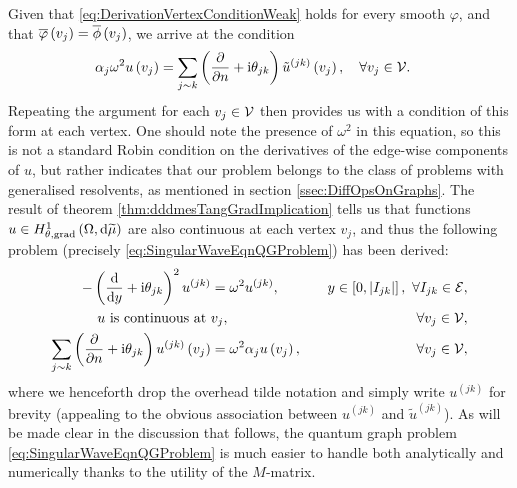 Given that \eqref{eq:DerivationVertexConditionWeak} holds for every smooth $\varphi$, and that $\overline{\varphi}\left( v_j \right)=\overline{\phi}\left( v_j \right)$, we arrive at the condition
\begin{align*}
	\alpha_j\omega^2 u\left( v_j \right) &= \sum_{j\sim k}\left( \dfrac{\partial }{\partial n} + \mathrm{i}\theta_{jk} \right)\tilde{u}^{(jk)}\left( v_j \right), \quad \forall v_j \in \mathcal{V}.
\end{align*}
Repeating the argument for each $v_j\in \mathcal{V}$ then provides us with a condition of this form at each vertex.
One should note the presence of $\omega^2$ in this equation, so this is not a standard Robin condition on the derivatives of the edge-wise components of $u$, but rather indicates that our problem belongs to the class of problems with generalised resolvents, as mentioned in section \ref{ssec:DiffOpsOnGraphs}.
The result of theorem \ref{thm:dddmesTangGradImplication} tells us that functions $u\in H^1_{\theta, \mathrm{grad}}\left( \Omega, \mathrm{d}\widetilde{\mu} \right)$ are also continuous at each vertex $v_j$, and thus the following problem (precisely \eqref{eq:SingularWaveEqnQGProblem}) has been derived:
\begin{subequations}
	\begin{align*}
		-\left( \dfrac{\mathrm{d}}{\mathrm{d}y} + \mathrm{i}\theta_{jk} \right)^2 u^{(jk)} &= \omega^2 u^{(jk)}, \quad &y\in\left[ 0,\left\lvert I_{jk} \right\rvert \right], \ \forall I_{jk}\in\mathcal{E}, \\
		u \text{ is continuous at } & v_j, \quad &\forall v_j\in\mathcal{V},  \\
		\sum_{j\sim k}\left( \dfrac{\partial }{\partial n} + \mathrm{i}\theta_{jk} \right)u^{(jk)}\left( v_j \right) &= \omega^2\alpha_j u\left( v_j \right), \quad &\forall v_j\in\mathcal{V},
	\end{align*}
\end{subequations}
where we henceforth drop the overhead tilde notation and simply write $u^{(jk)}$ for brevity (appealing to the obvious association between $u^{(jk)}$ and $\tilde{u}^{(jk)}$).
As will be made clear in the discussion that follows, the quantum graph problem \eqref{eq:SingularWaveEqnQGProblem} is much easier to handle both analytically and numerically thanks to the utility of the $M$-matrix.


